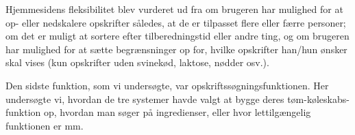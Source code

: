 Hjemmesidens fleksibilitet blev vurderet ud fra om brugeren har mulighed for \fx at op- eller nedskalere opskrifter således, at de er tilpasset flere eller færre personer; om det er muligt at sortere efter tilberedningstid eller andre ting, og om brugeren har mulighed for at sætte begrænsninger op for, hvilke opskrifter han/hun ønsker skal vises (\fx kun opskrifter uden svinekød, laktose, nødder osv.). 

Den sidste funktion, som vi undersøgte, var opskriftssøgningsfunktionen. Her undersøgte vi, hvordan de tre systemer havde valgt at bygge deres tøm-køleskabs-funktion op, \fx hvordan man søger på ingredienser, eller hvor lettilgængelig funktionen er mm.





